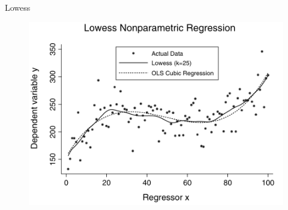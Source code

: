 \begin{frame}{Lowess}
  \begin{figure}[htbp]
  \begin{center}
  \includegraphics[width=\textwidth]{./resources/CTlowess}
  \label{loclinear2}
  \end{center}
  \end{figure}
\end{frame}

